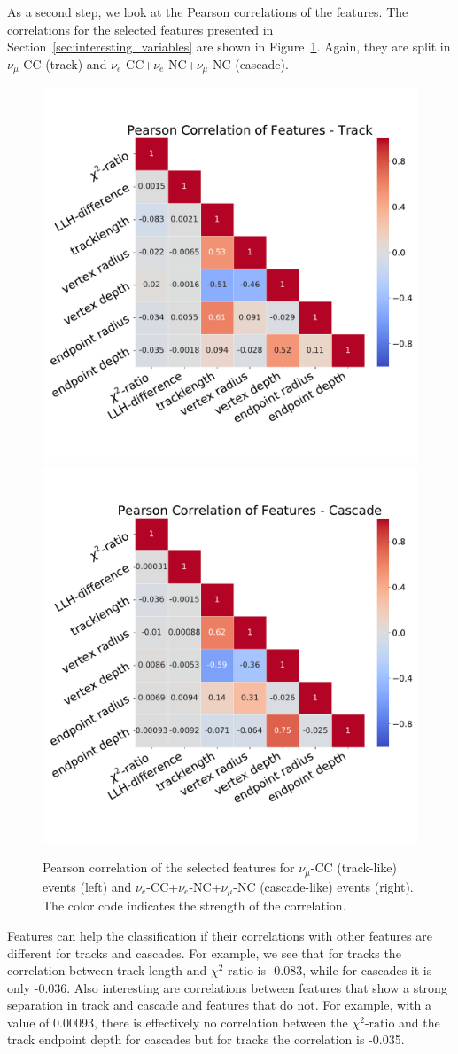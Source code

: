 As a second step, we look at the Pearson correlations \cite{stigler1989} of the features.
The correlations for the selected features presented in Section~\ref{sec:interesting_variables} are shown in Figure~\ref{fig:feature_correlations}.
Again, they are split in $\nu_\mu$-CC (track) and $\nu_e$-CC+$\nu_e$-NC+$\nu_\mu$-NC (cascade).
\begin{figure}[h]
    \centering
    \includegraphics[trim = 10 70 10 65, clip, width=0.49\linewidth]{figures/feature_correlations_Track.pdf}
    \includegraphics[trim = 10 70 10 65, clip, width=0.49\linewidth]{figures/feature_correlations_Cascade.pdf}
    \caption[Pearson correlation of the selected input features]{Pearson correlation of the selected features for $\nu_\mu$-CC (track-like) events (left) and $\nu_e$-CC+$\nu_e$-NC+$\nu_\mu$-NC (cascade-like) events (right). The color code indicates the strength of the correlation.}
    \label{fig:feature_correlations}
\end{figure}
Features can help the classification if their correlations with other features are different for tracks and cascades.
For example, we see that for tracks the correlation between track length and $\chi^2\textrm{-ratio}$ is -0.083, while for cascades it is only -0.036.
Also interesting are correlations between features that show a strong separation in track and cascade and features that do not.
For example, with a value of 0.00093, there is effectively no correlation between the $\chi^2\textrm{-ratio}$ and the track endpoint depth for cascades but for tracks the correlation is -0.035.

